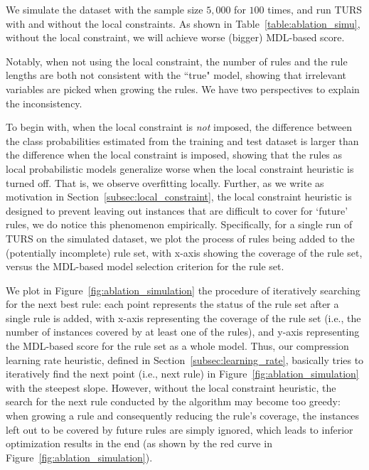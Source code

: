 We simulate the dataset with the sample size $5,000$ for $100$ times, and run TURS with and without the local constraints. As shown in Table~\ref{table:ablation_simu}, without the local constraint, we will achieve worse (bigger) MDL-based score. 

Notably, when not using the local constraint, the number of rules  and the rule lengths are both not consistent with the ``true" model, showing that irrelevant variables are picked when growing the rules. We have two perspectives to explain the inconsistency. 

To begin with, when the local constraint is \emph{not} imposed, the difference between the class probabilities estimated from the training and test dataset is larger than the difference when the local constraint is imposed, showing that the rules as local probabilistic models generalize worse when the local constraint heuristic is turned off. That is, we observe overfitting locally. Further, as we write as motivation in Section~\ref{subsec:local_constraint}, the local constraint heuristic is designed to prevent leaving out instances that are difficult to cover for `future' rules, we do notice this phenomenon empirically. Specifically, for a single run of TURS on the simulated dataset, we plot the process of rules being added to the (potentially incomplete) rule set, with x-axis showing the coverage of the rule set, versus the MDL-based model selection criterion for the rule set. 

We plot in Figure~\ref{fig:ablation_simulation} the procedure of iteratively searching for the next best rule: each point represents the status of the rule set after a single rule is added, with x-axis representing the coverage of the rule set (i.e., the number of instances covered by at least one of the rules), and y-axis representing the MDL-based score for the rule set as a whole model. Thus, our compression learning rate heuristic, defined in Section~\ref{subsec:learning_rate}, basically tries to iteratively find the next point (i.e., next rule) in Figure~\ref{fig:ablation_simulation} with the steepest slope. However, without the local constraint heuristic, the search for the next rule conducted by the algorithm may become too greedy: when growing a rule and consequently reducing the rule's coverage, the instances left out to be covered by future rules are simply ignored, which leads to inferior optimization results in the end (as shown by the red curve in Figure~\ref{fig:ablation_simulation}). 

